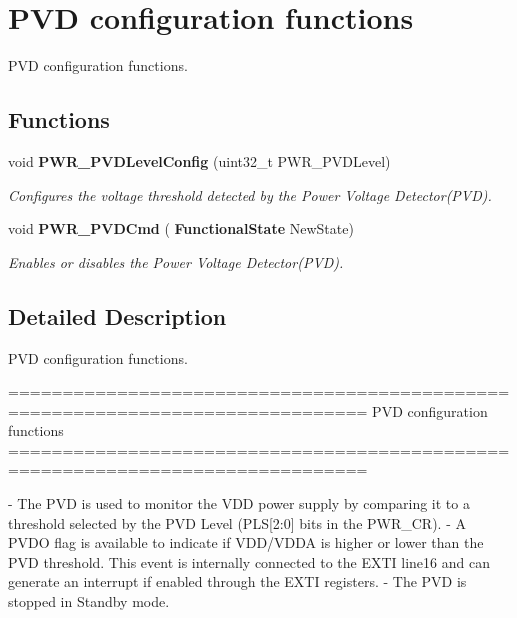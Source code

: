 \section{P\+VD configuration functions}
\label{group__PWR__Group2}


P\+VD configuration functions.  


\subsection*{Functions}
\begin{DoxyCompactItemize}
\item 
void \textbf{ P\+W\+R\+\_\+\+P\+V\+D\+Level\+Config} (uint32\+\_\+t P\+W\+R\+\_\+\+P\+V\+D\+Level)
\begin{DoxyCompactList}\small\item\em Configures the voltage threshold detected by the Power Voltage Detector(\+P\+V\+D). \end{DoxyCompactList}\item 
void \textbf{ P\+W\+R\+\_\+\+P\+V\+D\+Cmd} (\textbf{ Functional\+State} New\+State)
\begin{DoxyCompactList}\small\item\em Enables or disables the Power Voltage Detector(\+P\+V\+D). \end{DoxyCompactList}\end{DoxyCompactItemize}


\subsection{Detailed Description}
P\+VD configuration functions. 

\begin{DoxyVerb} ===============================================================================
                           PVD configuration functions
 ===============================================================================  

 - The PVD is used to monitor the VDD power supply by comparing it to a threshold
   selected by the PVD Level (PLS[2:0] bits in the PWR_CR).
 - A PVDO flag is available to indicate if VDD/VDDA is higher or lower than the 
   PVD threshold. This event is internally connected to the EXTI line16
   and can generate an interrupt if enabled through the EXTI registers.
 - The PVD is stopped in Standby mode.\end{DoxyVerb}
 

